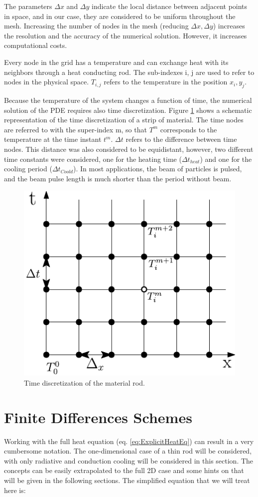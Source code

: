 The parameters $\Delta x$ and $\Delta y$ indicate the local distance between adjacent points in space, and in our case, they are considered to be uniform throughout the mesh. Increasing the number of nodes in the mesh (reducing $\Delta x , \Delta y$) increases the resolution and the accuracy of the numerical solution. However, it increases computational costs.

Every node in the grid has a temperature and can exchange heat with its neighbors through a heat conducting rod. The sub-indexes i, j are used to refer to nodes in the physical space.  $T_{i,j}$ refers to the temperature in the position $x_i , y_j$.

Because the temperature of the system changes a function of time, the numerical solution of the PDE requires also time discretization. Figure \ref{fig:TimeDiscret} shows a schematic representation of the time discretization of a strip of material. The time nodes are referred to with the super-index m, so that $T^{m}$ corresponds to the temperature at the time instant  $t^m$.  $\Delta t$ refers to the difference between time nodes. This distance was also considered to be equidistant, however, two different time constants were considered, one for the heating time ($\Delta {t}_{heat}$) and one for the cooling period ($\Delta t_{Coold}$). In most applications, the beam of particles is pulsed, and the beam pulse length is much shorter than the period without beam. 

\begin{figure}[h]
    \centering
    \includegraphics[width=0.4\columnwidth]{TimeDiscretization/TimeDiscret.pdf}
    \caption{Time discretization of the material rod.}
    \label{fig:TimeDiscret}
\end{figure}

\section{Finite Differences Schemes}
\label{sec:FD}

Working with the full heat equation (eq. \ref{eq:ExplicitHeatEq}) can result in a very cumbersome notation. 
The one-dimensional case of a thin rod will be considered, with only radiative and conduction cooling will be considered in this section. The concepts can be easily extrapolated to the full 2D case and some hints on that will be given in the following sections.  The simplified equation that we will treat here is: 


